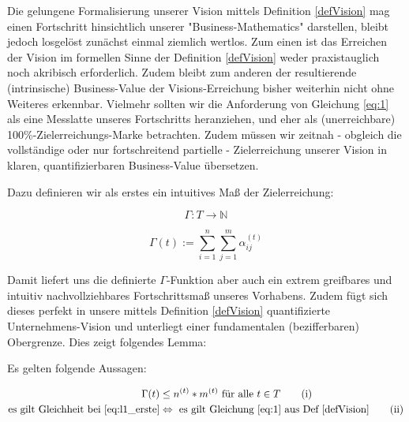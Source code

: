 \vspace{1cm}

Die gelungene Formalisierung unserer Vision mittels Definition \ref{defVision} mag einen Fortschritt hinsichtlich unserer "Business-Mathematics" darstellen, bleibt jedoch losgelöst zunächst einmal ziemlich wertlos. Zum einen ist das Erreichen der Vision im formellen Sinne der Definition \ref{defVision} weder praxistauglich noch akribisch erforderlich. Zudem bleibt zum anderen der resultierende (intrinsische) Business-Value der Visions-Erreichung bisher weiterhin nicht ohne Weiteres erkennbar.
Vielmehr sollten wir die Anforderung von Gleichung \eqref{eq:1} als eine Messlatte unseres Fortschritts heranziehen, und eher als (unerreichbare) 100\%-Zielerreichungs-Marke betrachten. Zudem müssen wir zeitnah - obgleich die vollständige oder nur fortschreitend partielle - Zielerreichung unserer Vision in klaren, quantifizierbaren Business-Value übersetzen.

Dazu definieren wir als erstes ein intuitives Maß der Zielerreichung:

\vspace{0.3cm}

\begin{Def}\label{defGamma2}

\begin{equation*}
  \Gamma : T \rightarrow \mathbb{N} 
\end{equation*}

\begin{equation*}
  \Gamma(t):= \sum_{i=1}^n \sum_{j=1}^m \alpha^{(t)}_{ij} 
\end{equation*}

\end{Def}

\vspace{1cm}

Damit liefert uns die definierte $\Gamma$-Funktion aber auch ein extrem greifbares und intuitiv nachvollziehbares Fortschrittsmaß unseres Vorhabens. Zudem fügt sich dieses perfekt in unsere mittels Definition \ref{defVision} quantifizierte Unternehmens-Vision und unterliegt einer fundamentalen (bezifferbaren) Obergrenze. Dies zeigt folgendes Lemma:

\vspace{0.3cm}

\begin{Lemma}

Es gelten folgende Aussagen:

\begin{align}
\Gamma(t) &\leq n^{(t)} * m^{(t)} \textrm{ für alle } t \in T \tag{i} \label{eq:l1_erste} \\ 
  \text{es gilt Gleichheit bei }  \eqref{eq:l1_erste} &\Leftrightarrow \text{ es gilt Gleichung } \eqref{eq:1} \text{ aus Def } \ref{defVision} \tag{ii} \label{eq:l1_zweite}
\end{align}

\end{Lemma}

